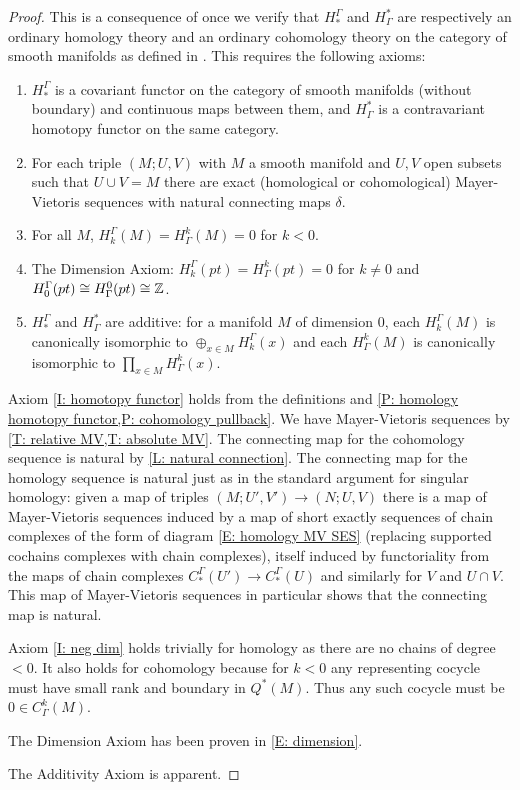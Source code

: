 \begin{proof}
	This is a consequence of \cite[Theorem 10]{Krec10b} once we verify that $H_*^\Gamma$ and $H^*_\Gamma$ are respectively an ordinary homology theory and an ordinary cohomology theory on the category of smooth manifolds as defined in \cite{Krec10b}. This requires the following axioms:

	\begin{enumerate}
		\item\label{I: homotopy functor} $H_*^\Gamma$ is a covariant functor on the category of smooth manifolds (without boundary) and continuous maps between them, and $H^*_\Gamma$ is a contravariant homotopy functor on the same category.

		\item For each triple $(M;U,V)$ with $M$ a smooth manifold and $U,V$ open subsets such that $U \cup V = M$ there are exact (homological or cohomological) Mayer-Vietoris sequences with natural connecting maps $\delta$.

		\item\label{I: neg dim} For all $M$, $H_k^\Gamma(M) = H^k_\Gamma(M) = 0$ for $k<0$.

		\item The Dimension Axiom: $H_k^\Gamma(pt) = H^k_\Gamma(pt) = 0$ for $k\neq 0$ and $H^\Gamma_0(pt) \cong H_\Gamma^0(pt) \cong \mathbb{Z}$.

		\item $H_*^\Gamma$ and $H^*_\Gamma$ are additive: for a manifold $M$ of dimension $0$, each $H_k^\Gamma(M)$ is canonically isomorphic to $\oplus_{x \in M} H_k^\Gamma(x)$ and each $H^k_\Gamma(M)$ is canonically isomorphic to $\prod_{x \in M} H^k_\Gamma(x)$.
	\end{enumerate}

	Axiom \ref{I: homotopy functor} holds from the definitions and \cref{P: homology homotopy functor,P: cohomology pullback}.
	We have Mayer-Vietoris sequences by \cref{T: relative MV,T: absolute MV}. The connecting map for the cohomology sequence is natural by \cref{L: natural connection}. The connecting map for the homology sequence is natural just as in the standard argument for singular homology: given a map of triples $(M;U',V') \to (N;U,V)$ there is a map of Mayer-Vietoris sequences induced by a map of short exactly sequences of chain complexes of the form of diagram \eqref{E: homology MV SES} (replacing supported cochains complexes with chain complexes), itself induced by functoriality from the maps of chain complexes $C_*^{\Gamma}(U') \to C_*^{\Gamma}(U)$ and similarly for $V$ and $U \cap V$. This map of Mayer-Vietoris sequences in particular shows that the connecting map is natural.

	Axiom \ref{I: neg dim} holds trivially for homology as there are no chains of degree $<0$. It also holds for cohomology because for $k<0$ any representing cocycle must have small rank and boundary in $Q^*(M)$. Thus any such cocycle must be $0 \in C^k_\Gamma(M)$.

	The Dimension Axiom has been proven in \cref{E: dimension}.

	The Additivity Axiom is apparent.
\end{proof}

